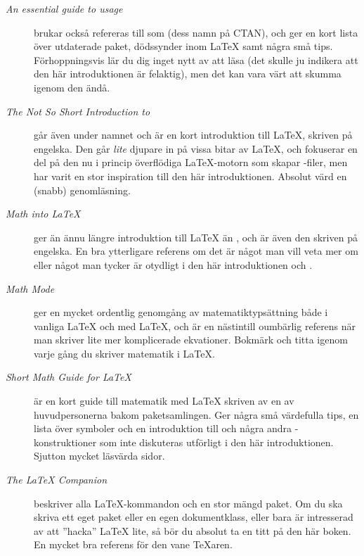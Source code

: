 \documentclass[10pt,../../a4.tex]{subfiles}
\begin{document}
\begin{description}
	\item[\emph{An essential guide to \LaTeXe{} usage} \parencite{Fenn07}]
	brukar också refereras till som  (dess namn på CTAN), och
	ger en kort lista över utdaterade paket, dödssynder inom \LaTeX{} samt
	några små tips. Förhoppningsvis lär du dig inget nytt av att läsa
	 (det skulle ju indikera att den här introduktionen är
	felaktig), men det kan vara värt att skumma igenom den ändå.
	
	\item[\emph{The Not So Short Introduction to \LaTeXe} \parencite{Oetiker11}]
	går även under namnet  och är
	en kort introduktion till \LaTeX,
	skriven på engelska. Den går \emph{lite} djupare in på vissa bitar
	av \LaTeX{}, och fokuserar en del på den nu i princip överflödiga
	\LaTeX-motorn som skapar \DVI-filer, men har varit en stor inspiration
	till den här introduktionen. Absolut värd en (snabb) genomläsning.
	
	\item[\emph{Math into \LaTeX} \parencite{Gratzer96}]
	ger än ännu längre introduktion till \LaTeX{} än , och
	är även den skriven på engelska. En bra ytterligare referens om det är
	något man vill veta mer om eller något man tycker är otydligt i den
	här introduktionen och .
	
	\item[\emph{Math Mode} \parencite{Voss10}]
	ger en mycket ordentlig
	genomgång av matematiktypsättning både i vanliga \LaTeX{} och med
	\AmS\LaTeX{}, och är en nästintill oumbärlig referens när man skriver
	lite mer komplicerade ekvationer. Bokmärk och titta igenom varje gång
	du skriver matematik i \LaTeX.
	
	\item[\emph{Short Math Guide for \LaTeX} \parencite{Downes02}]
	är en kort guide till matematik med \AmS\LaTeX{} skriven av en av
	huvudpersonerna bakom paketsamlingen. Ger några små värdefulla tips,
	en lista över symboler och en introduktion till
	 och några andra \AmS-konstruktioner som inte
	diskuteras utförligt i den här introduktionen. Sjutton mycket läsvärda
	sidor.
	
	\item[\emph{The \LaTeX{} Companion} \parencite{Mittelbach04}]
	beskriver alla \LaTeX-kommandon och en stor mängd paket. Om du ska
	skriva ett eget paket eller en egen dokumentklass, eller bara är
	intresserad av att ”hacka” \LaTeX{} lite, så bör du absolut ta en titt
	på den här boken. En mycket bra referens för den vane \TeX{}aren.
	

\end{description}
\end{document}
